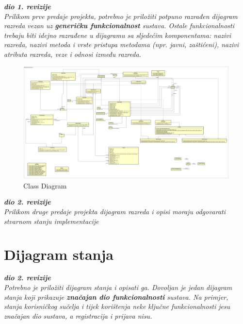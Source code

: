 			\textbf{\textit{dio 1. revizije}}\\
			
			\textit{Prilikom prve predaje projekta, potrebno je priložiti potpuno razrađen dijagram razreda vezan uz \textbf{generičku funkcionalnost} sustava. Ostale funkcionalnosti trebaju biti idejno razrađene u dijagramu sa sljedećim komponentama: nazivi razreda, nazivi metoda i vrste pristupa metodama (npr. javni, zaštićeni), nazivi atributa razreda, veze i odnosi između razreda.}\\
			
			\begin{figure}[H]
				\includegraphics[width=\linewidth]{diagrams/UML-OrganizationOfTheFestival_v1.png}
				\caption{Class Diagram}
				\label{fig:class_diag}
			\end{figure}
			
			\textbf{\textit{dio 2. revizije}}\\			
			
			\textit{Prilikom druge predaje projekta dijagram razreda i opisi moraju odgovarati stvarnom stanju implementacije}
			
			
			
			\eject
		
		\section{Dijagram stanja}
			
			
			\textbf{\textit{dio 2. revizije}}\\
			
			\textit{Potrebno je priložiti dijagram stanja i opisati ga. Dovoljan je jedan dijagram stanja koji prikazuje \textbf{značajan dio funkcionalnosti} sustava. Na primjer, stanja korisničkog sučelja i tijek korištenja neke ključne funkcionalnosti jesu značajan dio sustava, a registracija i prijava nisu. }
			
